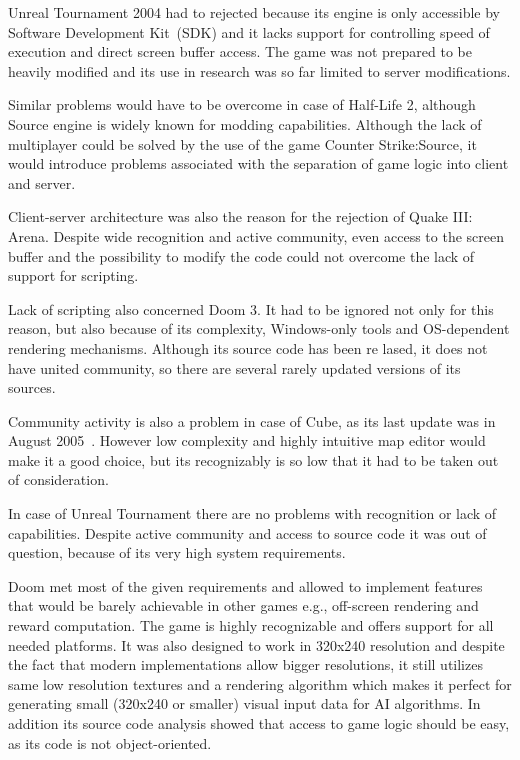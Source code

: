 Unreal Tournament 2004 had to rejected because its engine is only accessible by Software Development Kit~(SDK) and it lacks support for controlling speed of execution and direct screen buffer access.
The game was not prepared to be heavily modified and its use in research was so far limited to server modifications.

Similar problems would have to be overcome in case of Half-Life 2, although Source engine is widely known for modding capabilities.
Although the lack of multiplayer could be solved by the use of the game Counter Strike:Source, it would introduce problems associated with the separation of game logic into client and server.

Client-server architecture was also the reason for the rejection of Quake III: Arena.
Despite wide recognition and active community, even access to the screen buffer and the possibility to modify the code could not overcome the lack of support for scripting.

Lack of scripting also concerned Doom 3. 
It had to be ignored not only for this reason, but also because of its complexity, Windows-only tools and OS-dependent rendering mechanisms.
Although its source code has been re lased, it does not have united community, so there are several rarely updated versions of its sources.%

Community activity is also a problem in case of Cube, as its last update was in August 2005~\cite{cube}.
However low complexity and highly intuitive map editor would make it a good choice, but its recognizably is so low that it had to be taken out of consideration. 

In case of Unreal Tournament there are no problems with recognition or lack of capabilities.%
Despite active community and access to source code it was out of question, because of its very high system requirements.




Doom met most of the given requirements and allowed to implement features that would be barely achievable in other games e.g., off-screen rendering and reward computation.
The game is highly recognizable and offers support for all needed platforms.
It was also designed to work in 320x240 resolution and despite the fact that modern implementations allow bigger resolutions, it still utilizes same low resolution textures and a rendering algorithm which makes it perfect for generating small (320x240 or smaller) visual input data for AI algorithms.
In addition its source code analysis showed that access to game logic should be easy, as its code is not object-oriented.

